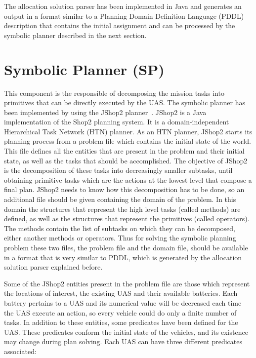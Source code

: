 \documentclass[twocolumn]{svjour3}          %
\begin{document}
The allocation solution parser has been implemented in Java and generates an output in a format similar to a Planning Domain Definition Language (PDDL) description that contains the initial assignment and can be processed by the symbolic planner described in the next section.

\section{Symbolic Planner (SP)}
    \label{sec:sp} 

This component is the responsible of decomposing the mission tasks into primitives that can be directly executed by the UAS. The symbolic planner has been implemented by using the JShop2 planner~\cite{Nau03shop2}. JShop2 is a Java implementation of the Shop2 planning system. It is a domain-independent Hierarchical Task Network (HTN) planner. As an HTN planner, JShop2 starts its planning process from a problem file which contains the initial state of the world. This file defines all the entities that are present in the problem and their initial state, as well as the tasks that should be accomplished. The objective of JShop2 is the decomposition of these tasks into decreasingly smaller subtasks, until obtaining primitive tasks which are the actions at the lowest level that compose a final plan. JShop2 needs to know how this decomposition has to be done, so an additional file should be given containing the domain of the problem. In this domain the structures that represent the high level tasks (called methods) are defined, as well as the structures that represent the primitives (called operators). The methods contain the list of subtasks on which they can be decomposed, either another methods or operators. Thus for solving the symbolic planning problem these two files, the problem file and the domain file, should be available in a format that is very similar to PDDL, which is generated by the allocation solution parser explained before.

Some of the JShop2 entities present in the problem file are those which represent the locations of interest, the existing UAS and their available batteries. Each battery pertains to a UAS and its numerical value will be decreased each time the UAS execute an action, so every vehicle could do only a finite number of tasks. In addition to these entities, some predicates have been defined for the UAS. These predicates conform the initial state of the vehicles, and its existence may change during plan solving. Each UAS can have three different predicates associated:
\end{document}
